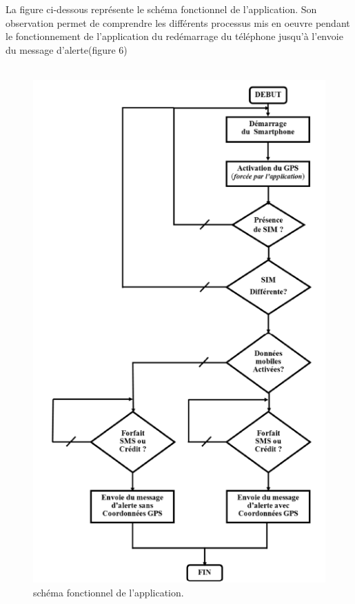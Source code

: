 \documentclass[a4paper, 12pt]{article}
\begin{document}
La figure ci-dessous représente le schéma fonctionnel de l’application. Son observation permet de comprendre les différents processus mis en oeuvre pendant le fonctionnement de l’application du redémarrage du téléphone jusqu’à l’envoie du message d’alerte(figure 6)\\





\\
\begin{figure}[h]
\begin{center}
\includegraphics[scale=0.75]{images2.png}
\end{center}
\caption{schéma fonctionnel de l’application.}
\end{figure}\\
\end{document}
